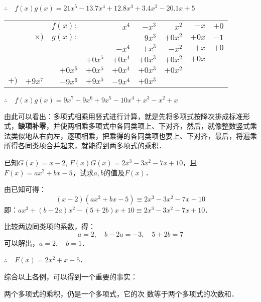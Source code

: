         $\therefore\quad f(x)g(x)=21x^5-13.7x^4+12.8x^3+3.4x^2-20.1x+5$

\begin{center}
    \begin{tabular}{rrrrrrrrr}
      &        &    $f(x):$    &        &    $x^4$    &    $-x^3$    &    $x^2$    &    $-x$    &    $+0$\\
&    $\times)$    &    $g(x):$    &        &        &    $9x^3$    &    $+0x^2$    &    $+0x$    &    $-1$\\
\hline
&        &        &        &    $-x^4$    &    $+x^3$    &    $-x^2$    &    $+x$    &    $+0$\\
&        &        &    $+0x^5$    &    $+0x^4$    &    $+0x^3$    &    $+0x^2$    &    $+0x$    &    \\
&        &    $+0x^6$    &    $+0x^5$    &    $+0x^4$    &    $+0x^3$    &    $+0x^2$    &        &    \\
$+)$    &    $+9x^7$    &    $-9x^6$    &    $+9x^5$    &    $-9x^4$    &    $+0x^3$    &        &        &    \\
\hline
\end{tabular}
\end{center} 

        $\therefore\quad f(x)g(x)=9x^7-9x^6+9x^5-10x^4+x^3-x^2+x$

由此可以看出：多项式相乘用竖式进行计算，就是先将多项式按降次排成标准形式，\textbf{缺项补零}，并使两相乘多项式中各同类项上、下对齐，然后，就像整数竖式乘法类似地从右向左，逐项相乘，把乘得的各同类项也要上、下对齐，最后，将遍乘所得各同类项合并起来，就能得到两多项式的乘积．

\begin{example}
    已知$G(x)=x-2$, $F(x)G(x)=2x^3-3x^2-7x+10$，且$F(x)=ax^2+bx-5$，试求$a,b$的值及$F(x)$．
\end{example}

\begin{solution}
    由已知可得：
    \[(x-2)(ax^2+bx-5)\equiv 2x^3-3x^2-7x+10 \]
    即：$ax^3+(b-2a)x^2-(5+2b)x+10\equiv 2x^3-3x^2-7x+10$．

    比较两边同类项的系数，得：
    \[a=2,\quad b-2a=-3,\quad 5+2b=7 \]
    可以解出，$a=2,\quad b=1$．

    $\therefore\quad F(x)=2x^2+x-5$．
\end{solution}

综合以上各例，可以得到一个重要的事实：
\begin{blk}{}
    两个多项式的乘积，仍是一个多项式，它的次
数等于两个多项式的次数和．
\end{blk}


